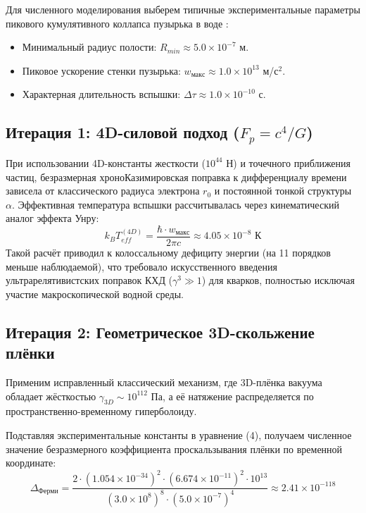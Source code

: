 \documentclass[twocolumn,PRL,amsmath,amssymb]{revtex4-1}
\begin{document}
Для численного моделирования выберем типичные экспериментальные параметры пикового кумулятивного коллапса пузырька в воде \cite{Putterman}:
\begin{itemize}
    \item Минимальный радиус полости: $R_{min} \approx 5.0 \times 10^{-7}$ м.
    \item Пиковое ускорение стенки пузырька: $w_{макс} \approx 1.0 \times 10^{13}$ м/с$^2$.
    \item Характерная длительность вспышки: $\Delta \tau \approx 1.0 \times 10^{-10}$ с.
\end{itemize}

\subsection{Итерация 1: 4D-силовой подход ($F_p = c^4/G$)}
При использовании 4D-константы жесткости ($10^{44}$ Н) и точечного приближения частиц, безразмерная хроноКазимировская поправка к дифференциалу времени зависела от классического радиуса электрона $r_0$ и постоянной тонкой структуры $\alpha$. Эффективная температура вспышки рассчитывалась через кинематический аналог эффекта Унру:
\begin{equation}
k_B T_{eff}^{(4D)} = \frac{\hbar \cdot w_{макс}}{2\pi c} \approx 4.05 \times 10^{-8} \text{ К}
\end{equation}
Такой расчёт приводил к колоссальному дефициту энергии (на 11 порядков меньше наблюдаемой), что требовало искусственного введения ультрарелятивистских поправок КХД ($\gamma^3 \gg 1$) для кварков, полностью исключая участие макроскопической водной среды.

\subsection{Итерация 2: Геометрическое 3D-скольжение плёнки}
Применим исправленный классический механизм, где 3D-плёнка вакуума обладает жёсткостью $\gamma_{3D} \sim 10^{112}$ Па, а её натяжение распределяется по пространственно-временному гиперболоиду. 

Подставляя экспериментальные константы в уравнение (4), получаем численное значение безразмерного коэффициента проскальзывания плёнки по временной координате:
\begin{equation}
\Delta_{Ферми} = \frac{2 \cdot (1.054\times 10^{-34})^2 \cdot (6.674\times 10^{-11})^2 \cdot 10^{13}}{(3.0\times 10^8)^8 \cdot (5.0\times 10^{-7})^4} \approx 2.41 \times 10^{-118}
\end{equation}
\end{document}
